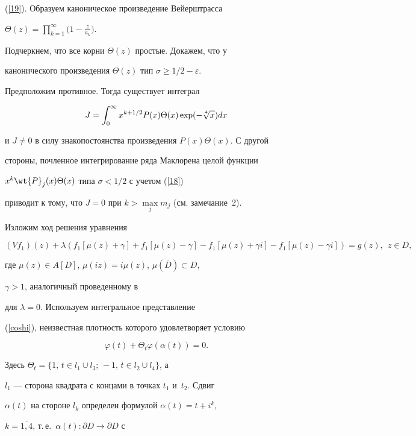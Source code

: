 (\ref{19}). Образуем каноническое произведение Вейерштрасса


$\Theta(z)=\prod\limits_{k=1}^\infty\big(1-\frac{z}{a_k}\big)$.


Подчеркнем, что все корни $\Theta(z)$ простые. Докажем, что у


канонического произведения $\Theta(z)$ тип $\sigma\ge1/2-\varepsilon$.


Предположим противное. Тогда существует интеграл


$$


J=\int_0^\infty x^{k+1/2}P(x)\Theta(x)\exp(-\sqrt[\uproot{2}4]x)dx


$$


и $J\ne 0$ в силу знакопостоянства произведения $P(x)\Theta(x)$. С другой


стороны, почленное интегрирование ряда Маклорена целой функции


$x^k\wt{P}_j(x)\Theta(x)$ типа $\sigma<1/2$ с учетом (\ref{18})


приводит к тому, что $J=0$ при $k>\max\limits_j m_j$ (см. замечание~2).





Изложим ход решения уравнения


$$


(Vf_1)(z)+\lambda(f_1[\mu(z)+\gamma]+f_1[\mu(z)-\gamma]


-f_1[\mu(z)+\gamma i]-f_1[\mu(z)-\gamma i])=g(z),\ \ z\in D,


$$


где $\mu(z)\in A[D]$, $\mu(iz)=i\mu(z)$, $\mu(\overline D)\subset D$,


$\gamma>1$, аналогичный проведенному в


\cite{Avtor1} для $\lambda=0$. Используем интегральное представление


(\ref{coshi}), неизвестная плотность которого удовлетворяет условию


$$


\varphi(t)+\Theta_t\varphi(\alpha(t))=0.


$$


Здесь $\Theta_t=\{1,\, t\in l_1\cup l_3;\, -1,\, t\in l_2\cup l_4\}$, а


$l_1$ --- сторона квадрата с концами в точках $t_1$ и~$t_2$. Сдвиг


$\alpha(t)$ на стороне $l_k$ определен формулой $\alpha(t)=t+i^k$,


$k=\overline{1,4}$, т.\,е.\ $\alpha(t): \partial D\to \partial D$ с


